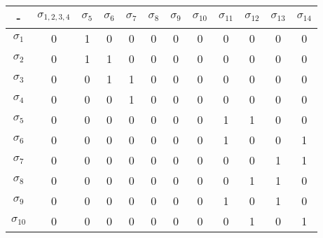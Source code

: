 \begin{enumerate}
    \begin{center}
        \begin{tabular}{|c|c|c|c|c|c|c|c|c|c|c|c|}
            \hline
            -             & $\sigma_{1,2,3,4}$ & $\sigma_5$ & $\sigma_6$ & $\sigma_7$ & $\sigma_8$ & $\sigma_9$ & $\sigma_{10}$ & $\sigma_{11}$ & $\sigma_{12}$ & $\sigma_{13}$ & $\sigma_{14}$ \\ \hline
            $\sigma_1$    & 0                  & 1          & 0          & 0          & 0          & 0          & 0             & 0             & 0             & 0             & 0             \\ \hline
            $\sigma_2$    & 0                  & 1          & 1          & 0          & 0          & 0          & 0             & 0             & 0             & 0             & 0             \\ \hline
            $\sigma_3$    & 0                  & 0          & 1          & 1          & 0          & 0          & 0             & 0             & 0             & 0             & 0             \\ \hline
            $\sigma_4$    & 0                  & 0          & 0          & 1          & 0          & 0          & 0             & 0             & 0             & 0             & 0             \\ \hline
            $\sigma_5$    & 0                  & 0          & 0          & 0          & 0          & 0          & 0             & 1             & 1             & 0             & 0             \\ \hline
            $\sigma_6$    & 0                  & 0          & 0          & 0          & 0          & 0          & 0             & 1             & 0             & 0             & 1             \\ \hline
            $\sigma_7$    & 0                  & 0          & 0          & 0          & 0          & 0          & 0             & 0             & 0             & 1             & 1             \\ \hline
            $\sigma_8$    & 0                  & 0          & 0          & 0          & 0          & 0          & 0             & 0             & 1             & 1             & 0             \\ \hline
            $\sigma_9$    & 0                  & 0          & 0          & 0          & 0          & 0          & 0             & 1             & 0             & 1             & 0             \\ \hline
            $\sigma_{10}$ & 0                  & 0          & 0          & 0          & 0          & 0          & 0             & 0             & 1             & 0             & 1             \\ \hline

\end{tabular}
\end{center}
\end{enumerate}
